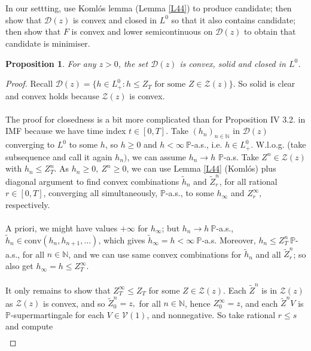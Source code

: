 \documentclass[12pt,a4paper, twoside]{article}
\newtheorem{prop}{Proposition}[section]
\theoremstyle{definition}
\newcommand{\PP}{\mathbb{P}} %
\begin{document}
\\\\
In our settting, use Komlós lemma (Lemma \ref{L44}) to produce candidate; then show that $\mathcal{D}(z)$ is convex and closed in $L^0$ so that it also contains candidate; then show that $F$ is convex and lower semicontinuous on $\mathcal{D}(z)$ to obtain that candidate is minimiser. 
\newpage
\begin{prop} \label{P112} For any $z>0$, the set $\mathcal{D}(z)$ is convex, solid and closed in $L^0$. 
\end{prop}
\begin{proof}
Recall $\mathcal{D}(z)= \{ h \in L_+^0: h \leq Z_T \text{ for some } Z \in \mathcal{Z}(z) \}$. So solid is clear and convex holds because $\mathcal{Z}(z)$ is convex. 
\\\\
The proof for closedness is a bit more complicated than for Proposition IV 3.2. in IMF because we have time index $t \in [0,T]$. Take $(h_n)_{n \in \mathbb{N}}$ in $\mathcal{D}(z)$ converging to $L^0$ to some $h$, so $h \geq 0$ and $h < \infty \ \PP$-a.s., i.e. $h \in L_+^0$. W.l.o.g. (take subsequence and call it again $h_n)$, we can assume $h_n \to h$ $\PP$-a.s. Take $Z^n \in \mathcal{Z}(z)$ with $h_n \leq Z_T^n$. As $h_n \geq 0, \ Z^n \geq 0$, we can use Lemma \ref{L44} (Komlós) plus diagonal argument to find convex combinations $\widetilde{h}_n$ and $\widetilde{Z}_r^n$, for all rational $r \in [0,T]$, converging all simultaneously, $\PP$-a.s., to some $h_\infty$ and $Z_r^\infty$, respectively. \\
\\
A priori, we might have values $+ \infty$ for $h_\infty$; but $h_n \to h \ \PP$-a.s., $\widetilde{h}_n \in \text{conv}(h_n, h_{n+1}, \dots )$, which gives $\widetilde{h}_\infty = h < \infty \ \PP$-a.s. Moreover, $h_n \leq Z_T^n \ \PP$-a.s., for all $n \in \mathbb{N}$, and we can use same convex combinations for $\widetilde{h}_n$ and all $\widetilde{Z}_r^n$; so also get $h_\infty = h \leq Z_T^\infty$. \\
\\
It only remains to show that $Z_T^\infty \leq Z_T$ for some $Z \in \mathcal{Z}(z)$. Each $\widetilde{Z}^n$ is in $\mathcal{Z}(z)$ as $\mathcal{Z}(z)$ is convex, and so $\widetilde{Z}_0^n=z,$ for all $n \in \mathbb{N}$, hence $Z_0^\infty= z$,  and each $\widetilde{Z}^nV$ is $\PP$-supermartingale for each $V \in \mathcal{V}(1)$, and nonnegative. So take rational $r \leq s$ and compute 
\begin{align*}

\end{align*}
\end{proof}
\end{document}
